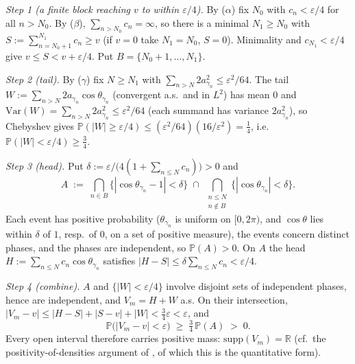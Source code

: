 \emph{Step 1 (a finite block reaching $v$ to within $\varepsilon/4$).}
By ($\alpha$) fix $N_0$ with $c_n<\varepsilon/4$ for all $n>N_0$. By
($\beta$), $\sum_{n>N_0}c_n=\infty$, so there is a minimal $N_1\ge N_0$
with $S:=\sum_{n=N_0+1}^{N_1}c_n\ge v$ (if $v=0$ take $N_1=N_0$,
$S=0$). Minimality and $c_{N_1}<\varepsilon/4$ give
$v\le S<v+\varepsilon/4$. Put $B=\{N_0+1,\dots,N_1\}$.

\emph{Step 2 (tail).} By ($\gamma$) fix $N\ge N_1$ with
$\sum_{n>N}2a_{\gamma_n}^2\le\varepsilon^2/64$. The tail
$W:=\sum_{n>N}2a_{\gamma_n}\cos\theta_{\gamma_n}$ (convergent a.s.\ and
in $L^2$) has mean $0$ and
$\mathrm{Var}(W)=\sum_{n>N}2a_{\gamma_n}^2\le\varepsilon^2/64$
(each summand has variance $2a_{\gamma_n}^2$), so Chebyshev gives
$\mathbb P(|W|\ge\varepsilon/4)\le(\varepsilon^2/64)(16/\varepsilon^2)
=\tfrac14$, i.e.\ $\mathbb P(|W|<\varepsilon/4)\ge\tfrac34$.

\emph{Step 3 (head).} Put
$\delta:=\varepsilon/\bigl(4(1+\sum_{n\le N}c_n)\bigr)>0$ and
\[
A\;:=\;\bigcap_{n\in B}\bigl\{|\cos\theta_{\gamma_n}-1|<\delta\bigr\}
\;\cap\;\bigcap_{\substack{n\le N\\ n\notin B}}
\bigl\{|\cos\theta_{\gamma_n}|<\delta\bigr\}.
\]
Each event has positive probability ($\theta_{\gamma_n}$ is uniform on
$[0,2\pi)$, and $\cos\theta$ lies within $\delta$ of $1$, resp.\ of
$0$, on a set of positive measure), the events concern distinct
phases, and the phases are independent, so $\mathbb P(A)>0$. On $A$
the head $H:=\sum_{n\le N}c_n\cos\theta_{\gamma_n}$ satisfies
$|H-S|\le\delta\sum_{n\le N}c_n<\varepsilon/4$.

\emph{Step 4 (combine).} $A$ and $\{|W|<\varepsilon/4\}$ involve
disjoint sets of independent phases, hence are independent, and
$V_m=H+W$ a.s. On their intersection,
$|V_m-v|\le|H-S|+|S-v|+|W|<\tfrac34\varepsilon<\varepsilon$, and
\[
\mathbb P\bigl(|V_m-v|<\varepsilon\bigr)
\;\ge\;\tfrac34\,\mathbb P(A)\;>\;0 .
\]
Every open interval therefore carries positive mass:
$\mathrm{supp}(V_m)=\mathbb R$ (cf.\ the positivity-of-densities
argument of \cite{RS94}, of which this is the quantitative form).



